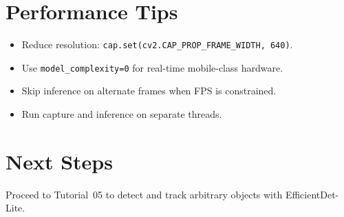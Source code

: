 \documentclass[12pt,a4paper]{article}
\begin{document}
\section{Performance Tips}

\begin{itemize}
    \item Reduce resolution: \texttt{cap.set(cv2.CAP\_PROP\_FRAME\_WIDTH, 640)}.
    \item Use \texttt{model\_complexity=0} for real-time mobile-class hardware.
    \item Skip inference on alternate frames when FPS is constrained.
    \item Run capture and inference on separate threads.
\end{itemize}

\section{Next Steps}

Proceed to Tutorial~05 to detect and track arbitrary objects with EfficientDet-Lite.
\end{document}
